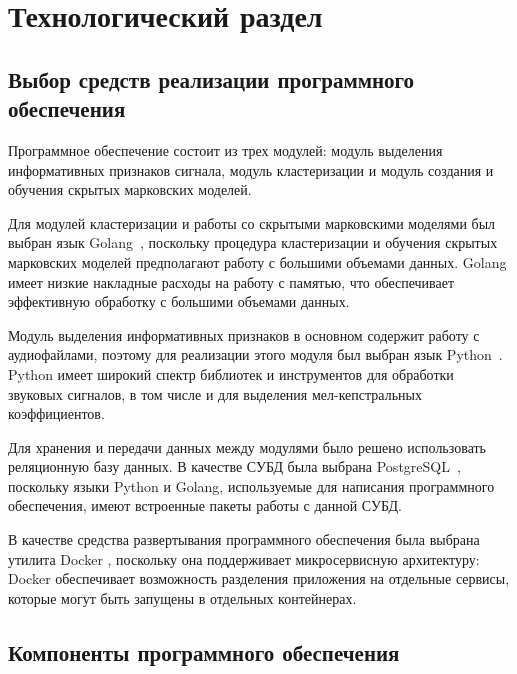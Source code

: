 \chapter{Технологический раздел}
\section{Выбор средств реализации программного обеспечения}
Программное обеспечение состоит из трех модулей: модуль выделения информативных признаков сигнала, модуль кластеризации и модуль создания и обучения скрытых марковских моделей. 

Для модулей кластеризации и работы со скрытыми марковскими моделями был выбран язык Golang~\cite{golang}, поскольку процедура кластеризации и обучения скрытых марковских моделей предполагают работу с большими объемами данных. Golang имеет низкие накладные расходы на работу с памятью, что обеспечивает эффективную обработку с большими объемами данных.

Модуль выделения информативных признаков в основном содержит работу с аудиофайлами, поэтому для реализации этого модуля был выбран язык Python~\cite{python}. Python имеет широкий спектр библиотек и инструментов для обработки звуковых сигналов, в том числе и для выделения мел-кепстральных коэффициентов.

Для хранения и передачи данных между модулями было решено использовать реляционную базу данных. В качестве СУБД была выбрана PostgreSQL~\cite{postgresql}, поскольку языки Python и Golang, используемые для написания программного обеспечения, имеют встроенные пакеты работы с данной СУБД.

В качестве средства развертывания программного обеспечения была выбрана утилита Docker \cite{docker}, поскольку она поддерживает микросервисную архитектуру: Docker обеспечивает возможность разделения приложения на отдельные сервисы, которые могут быть запущены в отдельных контейнерах. 

\section{Компоненты программного обеспечения} 
